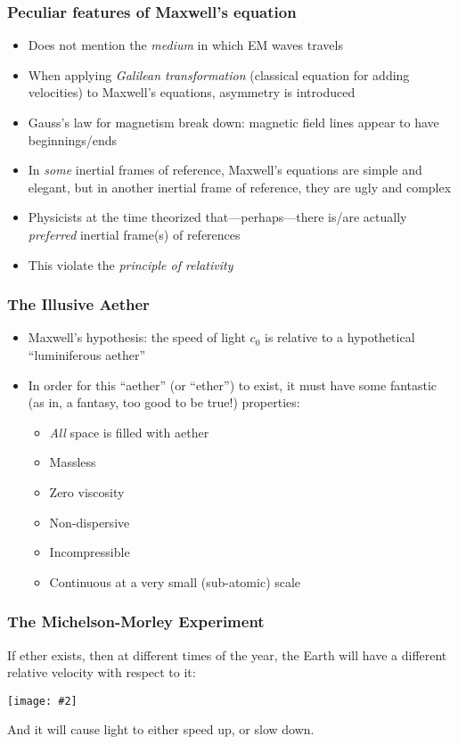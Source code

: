 \documentclass[12pt,compress,aspectratio=169]{beamer}
\newcommand{\pic}[2]{\texttt{[image: \#2]}}
\begin{document}
\begin{frame}
  \frametitle{Peculiar features of Maxwell's equation}
  \begin{itemize}
  \item Does not mention the \emph{medium} in which EM waves travels
  \item When applying \emph{Galilean transformation} (classical equation for
    adding velocities) to Maxwell's equations, asymmetry is introduced
  \item Gauss's law for magnetism break down: magnetic field lines appear to
    have beginnings/ends
  \item In \emph{some} inertial frames of reference,
    Maxwell's equations are simple and elegant, but in another inertial frame
    of reference, they are ugly and complex
  \item Physicists at the time theorized that---perhaps---there is/are actually
    \emph{preferred} inertial frame(s) of references
  \item This violate the \emph{principle of relativity}
  \end{itemize}
\end{frame}


\begin{frame}
  \frametitle{The Illusive Aether}
  \begin{itemize}
  \item Maxwell's hypothesis: the speed of light $c_0$ is relative to a
    hypothetical ``luminiferous aether''
  \item In order for this ``aether'' (or ``ether'') to exist, it must have some
    fantastic (as in, a fantasy, too good to be true!) properties:
    \begin{itemize}
    \item \emph{All} space is filled with aether
    \item Massless
    \item Zero viscosity
    \item Non-dispersive
    \item Incompressible
    \item Continuous at a very small (sub-atomic) scale
    \end{itemize}
  \end{itemize}
\end{frame}



\begin{frame}
  \frametitle{The Michelson-Morley Experiment}
  If ether exists, then at different times of the year, the Earth will have a
  different relative velocity with respect to it:
  \begin{center}
    \pic{.45}{graphics/2000px-AetherWind.png}
  \end{center}
  And it will cause light to either speed up, or slow down.
\end{frame}
\end{document}
